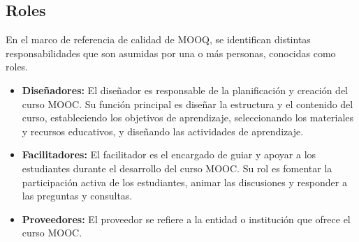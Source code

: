 
\subsection{Roles}
En el marco de referencia de calidad de MOOQ, se identifican distintas responsabilidades que son asumidas por una o más personas, conocidas como roles. 
\begin{itemize}
	\item \textbf{Diseñadores:}
	El diseñador es responsable de la planificación y creación del curso MOOC. Su función principal es diseñar la estructura y el contenido del curso, estableciendo los objetivos de aprendizaje, seleccionando los materiales y recursos educativos, y diseñando las actividades de aprendizaje. 
	\item \textbf{Facilitadores:}
	El facilitador es el encargado de guiar y apoyar a los estudiantes durante el desarrollo del curso MOOC. Su rol es fomentar la participación activa de los estudiantes, animar las discusiones y responder a las preguntas y consultas.
	\item \textbf{Proveedores:}
	El proveedor se refiere a la entidad o institución que ofrece el curso MOOC. 
\end{itemize}


